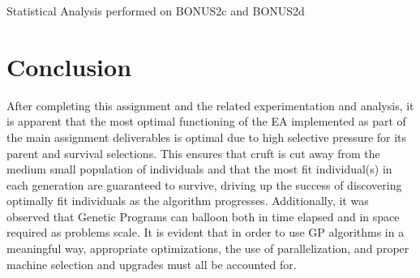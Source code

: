 \documentclass[11pt]{article}
\newcommand{\tablecaption}[1]{\caption{Statistical Analysis performed on {#1}}}
\begin{document}
\begin{table}[H] 
\tablecaption{BONUS2c and BONUS2d}        
\label{b2c_b2d}                 
\end{table}

\section{Conclusion}
After completing this assignment and the related experimentation and analysis,
it is apparent that the most optimal functioning of the EA implemented as part of
the main assignment deliverables is optimal due to high selective pressure for its
parent and survival selections. This ensures that cruft is cut away from the medium small
population of individuals and that the most fit individual(s) in each generation are
guaranteed to survive, driving up the success of discovering optimally fit individuals as the algorithm progresses.
Additionally, it was observed that Genetic Programs can
balloon both in time elapsed and in space required as problems scale. It is evident that in order to use GP algorithms
in a meaningful way, appropriate optimizations, the use of parallelization, and proper machine
selection and upgrades must all be accounted for.
\end{document}

